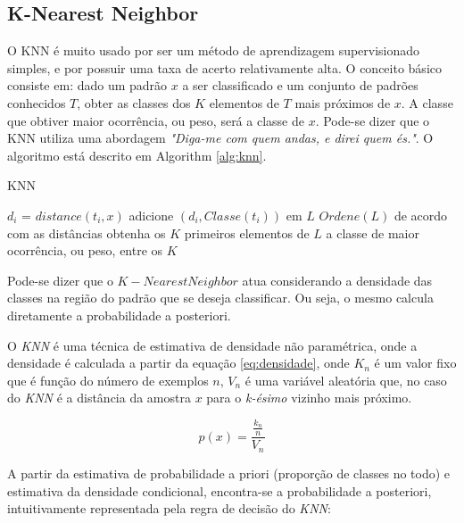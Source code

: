\subsection{K-Nearest Neighbor}
\label{subsec:knn}

O KNN é muito usado por ser um método de aprendizagem supervisionado simples, e por possuir uma taxa de acerto relativamente alta. O conceito básico consiste em: dado um padrão $x$ a ser classificado e um conjunto de padrões conhecidos $T$, obter as classes dos $K$ elementos de $T$ mais próximos de $x$. A classe que obtiver maior ocorrência, ou peso, será a classe de $x$. Pode-se dizer que o KNN utiliza uma abordagem \textit{"Diga-me com quem andas, e direi quem és."}. O algoritmo está descrito em Algorithm \ref{alg:knn}.

\begin{algorithm}[H]
\caption{KNN}
\label{alg:knn}
\begin{algorithmic}[1]
\STATE  $d_i$ = $distance(t_i, x)$
\STATE  adicione $(d_i, Classe(t_i))$ em $L$
\ENDFOR
\STATE $Ordene(L)$ de acordo com as distâncias
\STATE obtenha os $K$ primeiros elementos de $L$
\RETURN a classe de maior ocorrência, ou peso, entre os $K$
\end{algorithmic}
\end{algorithm}


Pode-se dizer que o $K-Nearest Neighbor$ atua considerando a densidade das classes na região do padrão que se deseja classificar. Ou seja, o mesmo calcula diretamente a probabilidade a posteriori.

O \textit{KNN} é uma técnica de estimativa de densidade não paramétrica, onde a densidade é calculada a partir da equação \ref{eq:densidade}, onde $K_n$ é um valor fixo que é função do número de exemplos $n$, $V_n$ é uma variável aleatória que, no caso do \textit{KNN} é a distância da amostra $x$ para o \textit{k-ésimo} vizinho mais próximo.

\begin{equation}
\label{eq:densidade}
p(x) = \frac{\frac{k_n}{n}}{V_n}
\end{equation}

A partir da estimativa de probabilidade a priori (proporção de classes no todo) e estimativa da densidade condicional, encontra-se a probabilidade a posteriori, intuitivamente representada pela regra de decisão do \textit{KNN}:

